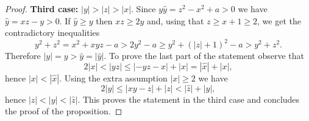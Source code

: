 \documentclass[10pt,a4paper]{amsart}
\begin{document}
\begin{proof}
	\smallskip\noindent
	{\bf Third case:} $|y|>|z|>|x|$.
Since $y\hat y = z^2-x^2+a>0$ we have $\hat y = xz-y>0$. If $\hat y \ge y$ then $xz \ge 2y$ 
and, using that $z\geq x+1\geq 2$, we get the contradictory inequalities
\[
y^2 + z^2 = x^2 + xyz-a > 2y^2-a \geq y^2 + (|z|+1)^2 - a > y^2 + z^2.
\]
Therefore $|y|=y > \hat y = |\hat y|$. 
To prove the last part of the statement observe that 
\[
2|x| < |yz| \leq |-yz-x|+|x| = |\hat x| + |x|, 
\]
hence $|x|<|\hat x|$. Using the extra assumption $|x|\geq 2$ we have  
$$
2|y| \leq |xy - z| + |z| < |\hat z| + |y|,
$$
hence $|z|<|y|<|\hat z|$. This proves the statement in the third case and concludes the proof of the proposition. 
\end{proof}
\end{document}
